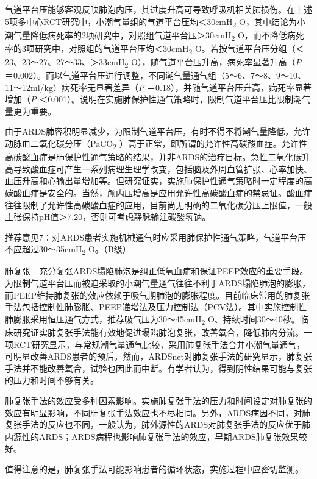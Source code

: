 气道平台压能够客观反映肺泡内压，其过度升高可导致呼吸机相关肺损伤。在上述5项多中心RCT研究中，小潮气量组的气道平台压均＜30cmH\textsubscript{2}
O，其中结论为小潮气量降低病死率的2项研究中，对照组气道平台压＞30cmH\textsubscript{2}
O，而不降低病死率的3项研究中，对照组的气道平台压均＜30cmH\textsubscript{2}
O。若按气道平台压分组（＜23、23～27、27～33、＞33cmH\textsubscript{2}
O），随气道平台压升高，病死率显著升高（\emph{P}
＝0.002）。而以气道平台压进行调整，不同潮气量通气组（5～6、7～8、9～10、11～12ml/kg）病死率无显著差异（\emph{P}
＝0.18），并随气道平台压升高，病死率显著增加（\emph{P}
＜0.001）。说明在实施肺保护性通气策略时，限制气道平台压比限制潮气量更为重要。

由于ARDS肺容积明显减少，为限制气道平台压，有时不得不将潮气量降低，允许动脉血二氧化碳分压（PaCO\textsubscript{2}
）高于正常，即所谓的允许性高碳酸血症。允许性高碳酸血症是肺保护性通气策略的结果，并非ARDS的治疗目标。急性二氧化碳升高导致酸血症可产生一系列病理生理学改变，包括脑及外周血管扩张、心率加快、血压升高和心输出量增加等。但研究证实，实施肺保护性通气策略时一定程度的高碳酸血症是安全的。当然，颅内压增高是应用允许性高碳酸血症的禁忌证。酸血症往往限制了允许性高碳酸血症的应用，目前尚无明确的二氧化碳分压上限值，一般主张保持pH值＞7.20，否则可考虑静脉输注碳酸氢钠。

推荐意见7：对ARDS患者实施机械通气时应采用肺保护性通气策略，气道平台压不应超过30～35cmH\textsubscript{2}
O。（B级）

肺复张　充分复张ARDS塌陷肺泡是纠正低氧血症和保证PEEP效应的重要手段。为限制气道平台压而被迫采取的小潮气量通气往往不利于ARDS塌陷肺泡的膨胀，而PEEP维持肺复张的效应依赖于吸气期肺泡的膨胀程度。目前临床常用的肺复张手法包括控制性肺膨胀、PEEP递增法及压力控制法（PCV法）。其中实施控制性肺膨胀采用恒压通气方式，推荐吸气压为30～45cmH\textsubscript{2}
O、持续时间30～40秒。临床研究证实肺复张手法能有效地促进塌陷肺泡复张，改善氧合，降低肺内分流。一项RCT研究显示，与常规潮气量通气比较，采用肺复张手法合并小潮气量通气，可明显改善ARDS患者的预后。然而，ARDSnet对肺复张手法的研究显示，肺复张手法并不能改善氧合，试验也因此而中断。有学者认为，得到阴性结果可能与复张的压力和时间不够有关。

肺复张手法的效应受多种因素影响。实施肺复张手法的压力和时间设定对肺复张的效应有明显影响，不同肺复张手法效应也不尽相同。另外，ARDS病因不同，对肺复张手法的反应也不同，一般认为，肺外源性的ARDS对肺复张手法的反应优于肺内源性的ARDS；ARDS病程也影响肺复张手法的效应，早期ARDS肺复张效果较好。

值得注意的是，肺复张手法可能影响患者的循环状态，实施过程中应密切监测。

